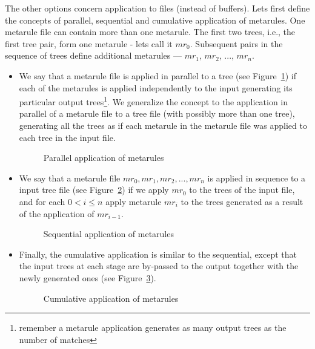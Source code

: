 The other options concern application to files (instead of buffers). 
Lets first define
the concepts of parallel, sequential and cumulative application of metarules. 
One metarule 
file can contain more than one metarule. The first two trees, i.e., the first
tree pair, form one metarule - lets call it $mr_0$. Subsequent pairs in the
sequence of trees define additional metarules --- 
$mr_1$, $mr_2$, ..., $mr_n$.

\begin{itemize}
\item We say that a metarule file is applied in parallel to a tree 
(see Figure~\ref{parallel})
if each of the 
metarules is applied independently to the input generating its particular 
output trees\footnote{remember a metarule application generates as many 
output trees as the number of matches}. We generalize the concept to the
application in parallel of a metarule file to a tree file (with possibly more 
than one tree), generating all the trees
as if each metarule in the metarule file was applied to each tree in the
input file.

\begin{figure}[htb]
\centerline{}
\caption{Parallel application of metarules}
\label{parallel}
\end{figure}

\item We say that a metarule file $mr_0, mr_1, mr_2, ...,mr_n$ is applied in 
sequence to a input tree file 
(see Figure~\ref{sequential})
if we apply $mr_0$ to the trees of the input file, and
for each $0<i\leq n$ apply metarule $mr_i$ to the trees generated as a 
result of the application of $mr_{i-1}$.

\begin{figure}[htb]
\centerline{}
\caption{Sequential application of metarules}
\label{sequential}
\end{figure}

\item Finally, the cumulative application is similar to the sequential, 
except that the input trees at each stage are by-passed to the output together
with the newly generated ones (see Figure~\ref{cumulative}).

\begin{figure}[htb]
\centerline{}
\caption{Cumulative application of metarules}
\label{cumulative}
\end{figure}

\end{itemize}

